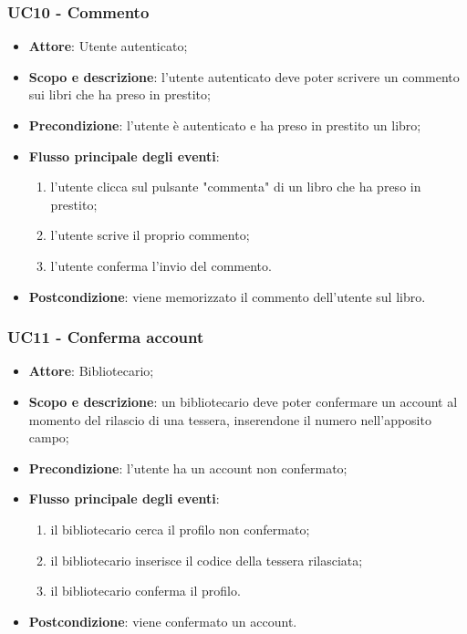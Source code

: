 \subsubsection{UC10 - Commento}
\begin{itemize}
	\item \textbf{Attore}: Utente autenticato;
	\item \textbf{Scopo e descrizione}: l'utente autenticato deve poter scrivere un commento sui libri che ha preso in prestito;
	\item \textbf{Precondizione}: l'utente è autenticato e ha preso in prestito un libro;
	\item \textbf{Flusso principale degli eventi}:
	\begin{enumerate}
		\item l'utente clicca sul pulsante "commenta" di un libro che ha preso in prestito;
		\item l'utente scrive il proprio commento;
		\item l'utente conferma l'invio del commento.
	\end{enumerate} 
	\item \textbf{Postcondizione}: viene memorizzato il commento dell'utente sul libro.
\end{itemize}

\subsubsection{UC11 - Conferma account}
\begin{itemize}
	\item \textbf{Attore}: Bibliotecario;
	\item \textbf{Scopo e descrizione}: un bibliotecario deve poter confermare un account al momento del rilascio di una tessera, inserendone il numero nell'apposito campo;
	\item \textbf{Precondizione}: l'utente ha un account non confermato;
	\item \textbf{Flusso principale degli eventi}:
	\begin{enumerate}
		\item il bibliotecario cerca il profilo non confermato;
		\item il bibliotecario inserisce il codice della tessera rilasciata;
		\item il bibliotecario conferma il profilo.
	\end{enumerate} 
	\item \textbf{Postcondizione}: viene confermato un account.
\end{itemize}

